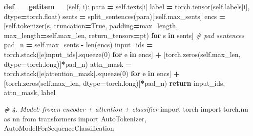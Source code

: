 \documentclass[
]{article}
\newenvironment{Shaded}{\begin{snugshade}}{\end{snugshade}}
\newcommand{\BuiltInTok}[1]{#1}
\newcommand{\CommentTok}[1]{\textcolor[rgb]{0.56,0.35,0.01}{\textit{#1}}}
\newcommand{\ControlFlowTok}[1]{\textcolor[rgb]{0.13,0.29,0.53}{\textbf{#1}}}
\newcommand{\DecValTok}[1]{\textcolor[rgb]{0.00,0.00,0.81}{#1}}
\newcommand{\FunctionTok}[1]{\textcolor[rgb]{0.13,0.29,0.53}{\textbf{#1}}}
\newcommand{\ImportTok}[1]{#1}
\newcommand{\KeywordTok}[1]{\textcolor[rgb]{0.13,0.29,0.53}{\textbf{#1}}}
\newcommand{\NormalTok}[1]{#1}
\newcommand{\OperatorTok}[1]{\textcolor[rgb]{0.81,0.36,0.00}{\textbf{#1}}}
\newcommand{\StringTok}[1]{\textcolor[rgb]{0.31,0.60,0.02}{#1}}
\newcommand{\VariableTok}[1]{\textcolor[rgb]{0.00,0.00,0.00}{#1}}
\begin{document}
\begin{Shaded}
\begin{Highlighting}[]
    \KeywordTok{def} \FunctionTok{\_\_getitem\_\_}\NormalTok{(}\VariableTok{self}\NormalTok{, i):}
\NormalTok{        para }\OperatorTok{=} \VariableTok{self}\NormalTok{.texts[i]}
\NormalTok{        label }\OperatorTok{=}\NormalTok{ torch.tensor(}\VariableTok{self}\NormalTok{.labels[i], dtype}\OperatorTok{=}\NormalTok{torch.}\BuiltInTok{float}\NormalTok{)}
\NormalTok{        sents }\OperatorTok{=}\NormalTok{ split\_sentences(para)[:}\VariableTok{self}\NormalTok{.max\_sents]}
\NormalTok{        encs }\OperatorTok{=}\NormalTok{ [}\VariableTok{self}\NormalTok{.tokenizer(s, truncation}\OperatorTok{=}\VariableTok{True}\NormalTok{, padding}\OperatorTok{=}\StringTok{\textquotesingle{}max\_length\textquotesingle{}}\NormalTok{,}
\NormalTok{                               max\_length}\OperatorTok{=}\VariableTok{self}\NormalTok{.max\_len, return\_tensors}\OperatorTok{=}\StringTok{\textquotesingle{}pt\textquotesingle{}}\NormalTok{)}
                \ControlFlowTok{for}\NormalTok{ s }\KeywordTok{in}\NormalTok{ sents]}
        \CommentTok{\# pad sentences}
\NormalTok{        pad\_n }\OperatorTok{=} \VariableTok{self}\NormalTok{.max\_sents }\OperatorTok{{-}} \BuiltInTok{len}\NormalTok{(encs)}
\NormalTok{        input\_ids }\OperatorTok{=}\NormalTok{ torch.stack([e[}\StringTok{\textquotesingle{}input\_ids\textquotesingle{}}\NormalTok{].squeeze(}\DecValTok{0}\NormalTok{) }\ControlFlowTok{for}\NormalTok{ e }\KeywordTok{in}\NormalTok{ encs] }\OperatorTok{+}
\NormalTok{                                [torch.zeros(}\VariableTok{self}\NormalTok{.max\_len, dtype}\OperatorTok{=}\NormalTok{torch.}\BuiltInTok{long}\NormalTok{)]}\OperatorTok{*}\NormalTok{pad\_n)}
\NormalTok{        attn\_mask }\OperatorTok{=}\NormalTok{ torch.stack([e[}\StringTok{\textquotesingle{}attention\_mask\textquotesingle{}}\NormalTok{].squeeze(}\DecValTok{0}\NormalTok{) }\ControlFlowTok{for}\NormalTok{ e }\KeywordTok{in}\NormalTok{ encs] }\OperatorTok{+}
\NormalTok{                                [torch.zeros(}\VariableTok{self}\NormalTok{.max\_len, dtype}\OperatorTok{=}\NormalTok{torch.}\BuiltInTok{long}\NormalTok{)]}\OperatorTok{*}\NormalTok{pad\_n)}
        \ControlFlowTok{return}\NormalTok{ input\_ids, attn\_mask, label}

\CommentTok{\# 4. Model: frozen encoder + attention + classifier}
\ImportTok{import}\NormalTok{ torch}
\ImportTok{import}\NormalTok{ torch.nn }\ImportTok{as}\NormalTok{ nn}
\ImportTok{from}\NormalTok{ transformers }\ImportTok{import}\NormalTok{ AutoTokenizer, AutoModelForSequenceClassification}


\end{Highlighting}
\end{Shaded}
\end{document}
